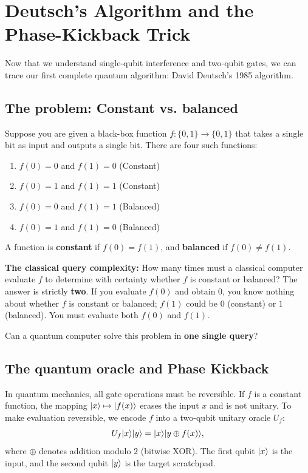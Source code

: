 \section{Deutsch's Algorithm and the Phase-Kickback Trick}
\label{ch42:deutsch}

Now that we understand single-qubit interference and two-qubit gates, we can trace our
first complete quantum algorithm: David Deutsch's 1985 algorithm.

\subsection{The problem: Constant vs. balanced}

Suppose you are given a black-box function $f: \{0, 1\} \to \{0, 1\}$ that takes a
single bit as input and outputs a single bit. There are four such functions:
\begin{enumerate}
  \item $f(0) = 0$ and $f(1) = 0$ (Constant)
  \item $f(0) = 1$ and $f(1) = 1$ (Constant)
  \item $f(0) = 0$ and $f(1) = 1$ (Balanced)
  \item $f(0) = 1$ and $f(1) = 0$ (Balanced)
\end{enumerate}
A function is \textbf{constant} if $f(0) = f(1)$, and \textbf{balanced} if $f(0) \ne f(1)$.

\textbf{The classical query complexity:}
How many times must a classical computer evaluate $f$ to determine with certainty
whether $f$ is constant or balanced?
The answer is strictly \textbf{two}. If you evaluate $f(0)$ and obtain $0$, you know
nothing about whether $f$ is constant or balanced; $f(1)$ could be $0$ (constant) or $1$
(balanced). You must evaluate both $f(0)$ and $f(1)$.

Can a quantum computer solve this problem in \textbf{one single query}?

\subsection{The quantum oracle and Phase Kickback}

In quantum mechanics, all gate operations must be reversible. If $f$ is a constant
function, the mapping $\lvert x \rangle \mapsto \lvert f(x) \rangle$ erases the input $x$ and is not
unitary. To make evaluation reversible, we encode $f$ into a two-qubit unitary oracle
$U_f$:
\[
  U_f \lvert x \rangle\lvert y \rangle = \lvert x \rangle\lvert y \oplus f(x) \rangle,
\]
where $\oplus$ denotes addition modulo $2$ (bitwise XOR). The first qubit $\lvert x \rangle$ is the
input, and the second qubit $\lvert y \rangle$ is the target scratchpad.

